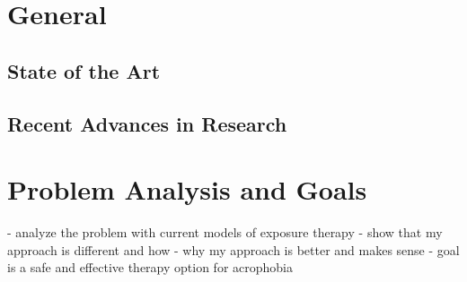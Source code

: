 \section{General}
\subsection{State of the Art}
\subsection{Recent Advances in Research}
\section{Problem Analysis and Goals}
- analyze the problem with current models of exposure therapy
- show that my approach is different and how
- why my approach is better and makes sense
- goal is a safe and effective therapy option for acrophobia


